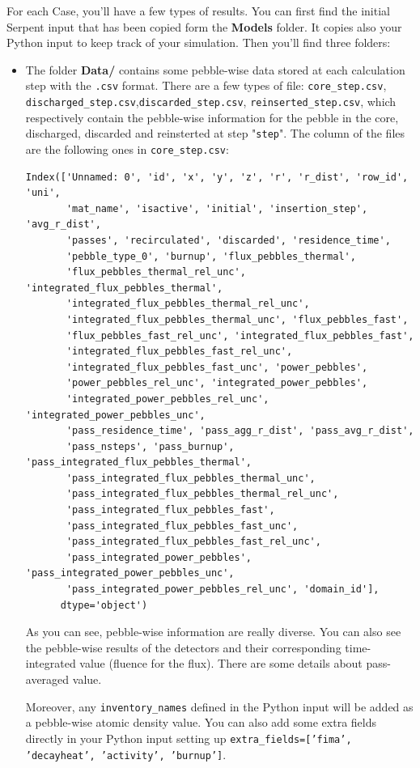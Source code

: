 \documentclass{article}
\begin{document}
For each Case, you'll have a few types of results. You can first find the initial Serpent input that has been copied form the \textbf{Models} folder. It copies also your Python input to keep track of your simulation. Then you'll find three folders:
\begin{itemize}
    \item The folder \textbf{Data/} contains some pebble-wise data stored at each calculation step with the \texttt{.csv} format. There are a few types of file: \texttt{core\_{step}.csv}, \texttt{discharged\_{step}.csv},\texttt{discarded\_{step}.csv}, 
    \texttt{reinserted\_{step}.csv}, which respectively contain the pebble-wise information for the pebble in the core, discharged, discarded and reinsterted at step "\texttt{step}". The column of the files are the following ones in \texttt{core\_{step}.csv}: 
    \begin{verbatim}
Index(['Unnamed: 0', 'id', 'x', 'y', 'z', 'r', 'r_dist', 'row_id', 'uni',
       'mat_name', 'isactive', 'initial', 'insertion_step', 'avg_r_dist',
       'passes', 'recirculated', 'discarded', 'residence_time',
       'pebble_type_0', 'burnup', 'flux_pebbles_thermal',
       'flux_pebbles_thermal_rel_unc', 'integrated_flux_pebbles_thermal',
       'integrated_flux_pebbles_thermal_rel_unc',
       'integrated_flux_pebbles_thermal_unc', 'flux_pebbles_fast',
       'flux_pebbles_fast_rel_unc', 'integrated_flux_pebbles_fast',
       'integrated_flux_pebbles_fast_rel_unc',
       'integrated_flux_pebbles_fast_unc', 'power_pebbles',
       'power_pebbles_rel_unc', 'integrated_power_pebbles',
       'integrated_power_pebbles_rel_unc', 'integrated_power_pebbles_unc',
       'pass_residence_time', 'pass_agg_r_dist', 'pass_avg_r_dist',
       'pass_nsteps', 'pass_burnup', 'pass_integrated_flux_pebbles_thermal',
       'pass_integrated_flux_pebbles_thermal_unc',
       'pass_integrated_flux_pebbles_thermal_rel_unc',
       'pass_integrated_flux_pebbles_fast',
       'pass_integrated_flux_pebbles_fast_unc',
       'pass_integrated_flux_pebbles_fast_rel_unc',
       'pass_integrated_power_pebbles', 'pass_integrated_power_pebbles_unc',
       'pass_integrated_power_pebbles_rel_unc', 'domain_id'],
      dtype='object')
    \end{verbatim}
As you can see, pebble-wise information are really diverse. You can also see the pebble-wise results of the detectors and their corresponding time-integrated value (fluence for the flux). There are some details about pass-averaged value. 

Moreover, any \texttt{inventory\_names} defined in the Python input will be added as a pebble-wise atomic density value. You can also add some extra fields directly in your Python input setting up 
\texttt{extra\_fields=['fima', 'decayheat', 'activity', 'burnup']}.


\end{itemize}
\end{document}
